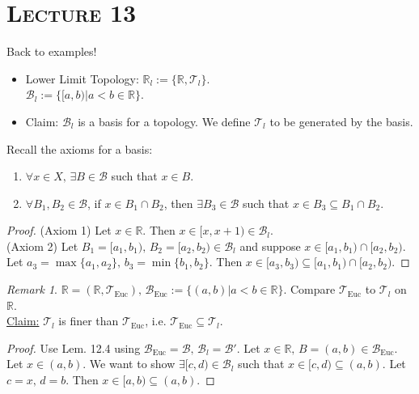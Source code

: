\documentclass{article}
\newcommand{\R}{\ensuremath{\mathbb{R}}}
\newcommand{\B}{\ensuremath{\mathcal{B}}}
\newcommand{\tp}{\ensuremath{\mathcal{T}}}
\newcommand{\Ts}[2]{\ensuremath{(#1,#2)}}
\newcommand{\tpeuc}{\ensuremath{\tp_\text{Euc}}}
\newcommand{\Beuc}{\ensuremath{\B_\text{Euc}}}
\newcommand{\inter}{\cap}
\renewcommand{\Subset}{\subseteq}
\theoremstyle{definition}
\theoremstyle{remark}
\newtheorem*{rem}{Remark}
\begin{document}
    \noindent\section*{\textbf{\textsc{Lecture 13}}}
        Back to examples!
        \begin{itemize}
            \item Lower Limit Topology: $\R_l := \{\R, \tp_l\}$.\\
            $\B_l := \{[a,b)|a<b\in \R\}$.
            \item Claim: $\B_l$ is a basis for a topology. We define $\tp_l$ to be generated by the basis.
        \end{itemize}
        
        \noindent Recall the axioms for a basis:
        \begin{enumerate}
            \item $\forall x \in X, \, \exists B \in \B$ such that $x \in B$.
            \item $\forall B_1,B_2 \in \B$, if $x \in B_1 \inter B_2$, then $\exists B_3 \in \B$ such that $x \in B_3 \Subset B_1 \inter B_2$.
        \end{enumerate}
        
        \begin{proof}
            (Axiom 1) Let $x \in \R$. Then $x \in [x,x+1) \in \B_l$.\\
            (Axiom 2) Let $B_1 = [a_1,b_1), \, B_2=[a_2,b_2) \in \B_l$ and suppose $x \in [a_1,b_1) \inter [a_2,b_2)$. Let $a_3 = \max\{a_1,a_2\}, \, b_3= \min\{b_1,b_2\}$. Then $x \in [a_3,b_3) \Subset [a_1,b_1) \inter [a_2,b_2)$.
        \end{proof}
        
        \begin{rem}
            $\R = \Ts{\R}{\tpeuc}, \, \Beuc := \{(a,b)|a<b\in \R\}$. Compare $\tpeuc$ to $\tp_l$ on $\R$.\\
            \underline{Claim:} $\tp_l$ is finer than $\tpeuc$, i.e. $\tpeuc \Subset \tp_l$.
        \end{rem}
        
        \begin{proof}
            Use Lem. 12.4 using $\Beuc = \B, \, \B_l = \B'$. Let $x \in \R, \, B=(a,b) \in \Beuc$. Let $x \in (a,b)$. We want to show $\exists[c,d) \in \B_l$ such that $x \in [c,d) \Subset (a,b)$. Let $c=x, \, d=b$. Then $x \in [a,b) \Subset (a,b)$.
        \end{proof}
        
\end{document}
